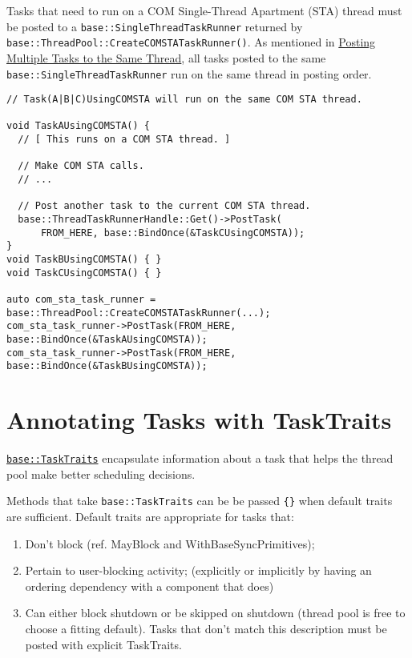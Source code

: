 \documentclass[a4paper,12pt,notitlepage,twoside,openright]{article}
\begin{document}
Tasks that need to run on a COM Single-Thread Apartment (STA) thread
must be posted to a \texttt{base::SingleThreadTaskRunner} returned by
\texttt{base::ThreadPool::CreateCOMSTATaskRunner()}. As mentioned in
\protect\hyperlink{Posting-Multiple-Tasks-to-the-Same-Thread}{Posting
Multiple Tasks to the Same Thread}, all tasks posted to the same
\texttt{base::SingleThreadTaskRunner} run on the same thread in posting
order.

\begin{verbatim}
// Task(A|B|C)UsingCOMSTA will run on the same COM STA thread.

void TaskAUsingCOMSTA() {
  // [ This runs on a COM STA thread. ]

  // Make COM STA calls.
  // ...

  // Post another task to the current COM STA thread.
  base::ThreadTaskRunnerHandle::Get()->PostTask(
      FROM_HERE, base::BindOnce(&TaskCUsingCOMSTA));
}
void TaskBUsingCOMSTA() { }
void TaskCUsingCOMSTA() { }

auto com_sta_task_runner = base::ThreadPool::CreateCOMSTATaskRunner(...);
com_sta_task_runner->PostTask(FROM_HERE, base::BindOnce(&TaskAUsingCOMSTA));
com_sta_task_runner->PostTask(FROM_HERE, base::BindOnce(&TaskBUsingCOMSTA));
\end{verbatim}

\hypertarget{annotating-tasks-with-tasktraits}{%
\section{Annotating Tasks with
TaskTraits}\label{annotating-tasks-with-tasktraits}}

\href{https://cs.chromium.org/chromium/src/base/task/task_traits.h}{\texttt{base::TaskTraits}}
encapsulate information about a task that helps the thread pool make
better scheduling decisions.

Methods that take \texttt{base::TaskTraits} can be be passed
\texttt{\{\}} when default traits are sufficient. Default traits are
appropriate for tasks that:

\begin{enumerate}
  \item Don't block (ref. MayBlock and WithBaseSyncPrimitives);
  \item Pertain to user-blocking activity;
  (explicitly or implicitly by having an ordering dependency with a
  component that does)
  \item Can either block shutdown or be skipped on
  shutdown (thread pool is free to choose a fitting default). Tasks that
  don't match this description must be posted with explicit TaskTraits.
\end{enumerate}
\end{document}
